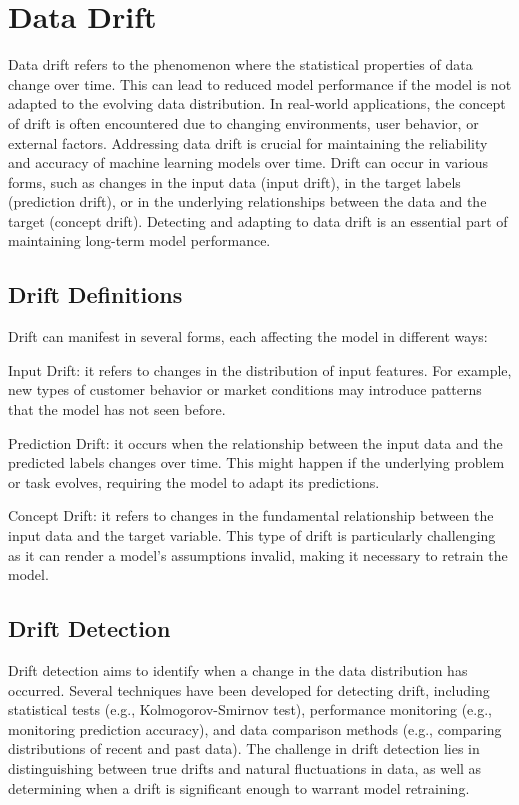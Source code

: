\section{Data Drift}\label{sec:data_drift}
Data drift refers to the phenomenon where the statistical properties of data
change over time. This can lead to reduced model performance if the model is
not adapted to the evolving data distribution. In real-world applications, the
concept of drift is often encountered due to changing environments, user
behavior, or external factors. Addressing data drift is crucial for maintaining
the reliability and accuracy of machine learning models over time. Drift can
occur in various forms, such as changes in the input data (input drift), in the
target labels (prediction drift), or in the underlying relationships between
the data and the target (concept drift). Detecting and adapting to data drift
is an essential part of maintaining long-term model performance.

\subsection{Drift Definitions}\label{subsec:drift_definitions}
Drift can manifest in several forms, each affecting the model in different
ways:

Input Drift: it refers to changes in the distribution of input features. For
example, new types of customer behavior or market conditions may introduce
patterns that the model has not seen before.

Prediction Drift: it occurs when the relationship between the input data and
the predicted labels changes over time. This might happen if the underlying
problem or task evolves, requiring the model to adapt its predictions.

Concept Drift: it refers to changes in the fundamental relationship between the
input data and the target variable. This type of drift is particularly
challenging as it can render a model's assumptions invalid, making it necessary
to retrain the model.

\subsection{Drift Detection}\label{subsec:drift_detection}
Drift detection aims to identify when a change in the data distribution has
occurred. Several techniques have been developed for detecting drift, including
statistical tests (e.g., Kolmogorov-Smirnov test), performance monitoring
(e.g., monitoring prediction accuracy), and data comparison methods (e.g.,
comparing distributions of recent and past data). The challenge in drift
detection lies in distinguishing between true drifts and natural fluctuations
in data, as well as determining when a drift is significant enough to warrant
model retraining.

